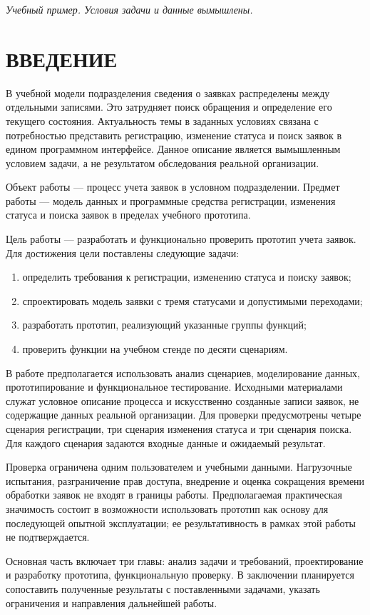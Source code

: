 \documentclass[a4paper,14pt]{extarticle}
\begin{document}
\noindent\textit{Учебный пример. Условия задачи и данные вымышлены.}
\tableofcontents
\clearpage
\section*{\centering\normalsize ВВЕДЕНИЕ}
В учебной модели подразделения сведения о заявках распределены между отдельными
записями. Это затрудняет поиск обращения и определение его текущего состояния.
Актуальность темы в заданных условиях связана с потребностью представить
регистрацию, изменение статуса и поиск заявок в едином программном интерфейсе.
Данное описание является вымышленным условием задачи, а не результатом
обследования реальной организации.

Объект работы --- процесс учета заявок в условном подразделении. Предмет работы
--- модель данных и программные средства регистрации, изменения статуса
и поиска заявок в пределах учебного прототипа.

Цель работы --- разработать и функционально проверить прототип учета заявок.
Для достижения цели поставлены следующие задачи:
\begin{enumerate}
    \item определить требования к регистрации, изменению статуса и поиску заявок;
    \item спроектировать модель заявки с тремя статусами и допустимыми переходами;
    \item разработать прототип, реализующий указанные группы функций;
    \item проверить функции на учебном стенде по десяти сценариям.
\end{enumerate}

В работе предполагается использовать анализ сценариев, моделирование данных,
прототипирование и функциональное тестирование. Исходными материалами служат
условное описание процесса и искусственно созданные записи заявок, не содержащие
данных реальной организации. Для проверки предусмотрены четыре сценария
регистрации, три сценария изменения статуса и три сценария поиска.
Для каждого сценария задаются входные данные и ожидаемый результат.

Проверка ограничена одним пользователем и учебными данными. Нагрузочные испытания,
разграничение прав доступа, внедрение и оценка сокращения времени обработки
заявок не входят в границы работы. Предполагаемая практическая значимость состоит
в возможности использовать прототип как основу для последующей опытной эксплуатации;
ее результативность в рамках этой работы не подтверждается.

Основная часть включает три главы: анализ задачи и требований, проектирование
и разработку прототипа, функциональную проверку. В заключении планируется
сопоставить полученные результаты с поставленными задачами, указать ограничения
и направления дальнейшей работы.
\end{document}
